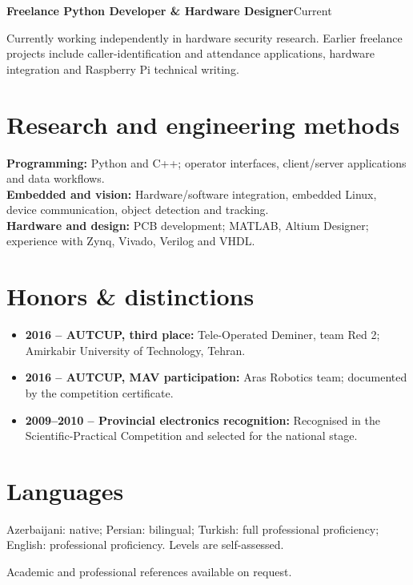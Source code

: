 \documentclass[11pt,a4paper]{article}
\newcommand{\entry}[2]{\textbf{#1}\hfill{\small\color{muted}#2}\par}
\begin{document}
\entry{Freelance Python Developer \& Hardware Designer}{Current}
Currently working independently in hardware security research. Earlier freelance projects include caller-identification and attendance applications, hardware integration and Raspberry Pi technical writing.

\section*{Research and engineering methods}
\textbf{Programming:} Python and C++; operator interfaces, client/server applications and data workflows.\\
\textbf{Embedded and vision:} Hardware/software integration, embedded Linux, device communication, object detection and tracking.\\
\textbf{Hardware and design:} PCB development; MATLAB, Altium Designer; experience with Zynq, Vivado, Verilog and VHDL.

\section*{Honors \& distinctions}
\begin{itemize}
  \item \textbf{2016 -- AUTCUP, third place:} Tele-Operated Deminer, team Red 2; Amirkabir University of Technology, Tehran.
  \item \textbf{2016 -- AUTCUP, MAV participation:} Aras Robotics team; documented by the competition certificate.
  \item \textbf{2009--2010 -- Provincial electronics recognition:} Recognised in the Scientific-Practical Competition and selected for the national stage.
\end{itemize}

\section*{Languages}
Azerbaijani: native; Persian: bilingual; Turkish: full professional proficiency; English: professional proficiency. {\small\color{muted}Levels are self-assessed.}
\par{\small\color{muted}Academic and professional references available on request.}
\end{document}
